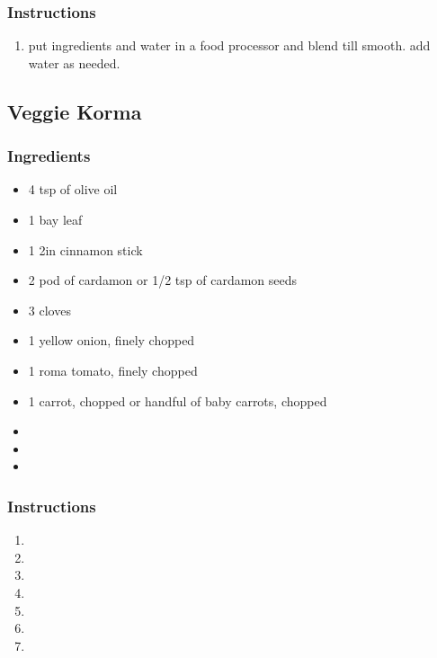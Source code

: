 \documentclass[11pt]{article}
\begin{document}
\subsubsection*{Instructions}
\label{sec:orge065105}
\begin{enumerate}
\item put ingredients and water in a food processor and blend till smooth. add water as needed.
\end{enumerate}
\subsection{Veggie Korma}
\label{sec:orgc8a9940}
\subsubsection*{Ingredients}
\label{sec:org89072c3}
\begin{itemize}
\item 4 tsp of olive oil
\item 1 bay leaf
\item 1 2in cinnamon stick
\item 2 pod of cardamon or 1/2 tsp of cardamon seeds
\item 3 cloves
\item 1 yellow onion, finely chopped
\item 1 roma tomato, finely chopped
\item 1 carrot, chopped or handful of baby carrots, chopped
\item 

\item 

\item 
\end{itemize}
\subsubsection*{Instructions}
\label{sec:org1df3a2b}
\begin{enumerate}
\item 

\item 

\item 

\item 

\item 

\item 

\item 
\end{enumerate}
\end{document}
